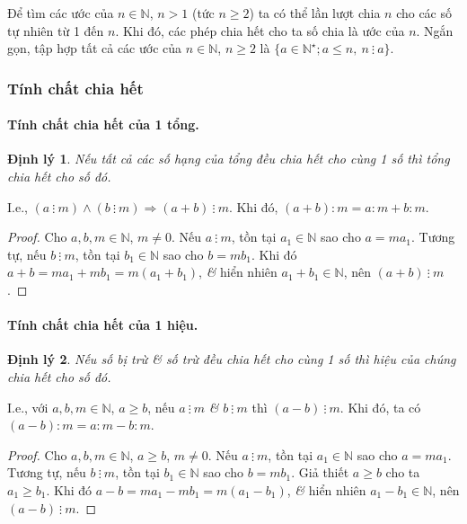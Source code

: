 \documentclass{article}
\numberwithin{equation}{section}
\newtheorem{theorem}{Định lý}[section]
\begin{document}
Để tìm các ước của $n\in\mathbb{N}$, $n > 1$ (tức $n\ge 2$) ta có thể lần lượt chia $n$ cho các số tự nhiên từ 1 đến $n$. Khi đó, các phép chia hết cho ta số chia là ước của $n$. Ngắn gọn, tập hợp tất cả các ước của $n\in\mathbb{N}$, $n\ge 2$ là $\{a\in\mathbb{N}^\star;a\le n,\ n\ \vdots\ a\}$.

\subsubsection{Tính chất chia hết}

\paragraph{Tính chất chia hết của 1 tổng.}
\begin{theorem}
	Nếu tất cả các số hạng của tổng đều chia hết cho cùng 1 số thì tổng chia hết cho số đó.
\end{theorem}
I.e., $(a\ \vdots\ m)\land(b\ \vdots\ m)\Rightarrow(a + b)\ \vdots\ m$. Khi đó, $(a + b):m = a:m + b:m$.

\begin{proof}[Proof]
	Cho $a,b,m\in\mathbb{N}$, $m\ne 0$. Nếu $a\ \vdots\ m$, tồn tại $a_1\in\mathbb{N}$ sao cho $a = ma_1$. Tương tự, nếu $b\ \vdots\ m$, tồn tại $b_1\in\mathbb{N}$ sao cho $b = mb_1$. Khi đó $a + b = ma_1 + mb_1 = m(a_1 + b_1)$, \textit{\&} hiển nhiên $a_1 + b_1\in\mathbb{N}$, nên $(a + b)\ \vdots\ m$.
\end{proof}

\paragraph{Tính chất chia hết của 1 hiệu.}
\begin{theorem}
	Nếu số bị trừ \textit{\&} số trừ đều chia hết cho cùng 1 số thì hiệu của chúng chia hết cho số đó.
\end{theorem}
I.e., với $a,b,m\in\mathbb{N}$, $a\ge b$, nếu $a\ \vdots\ m$ \textit{\&} $b\ \vdots\ m$ thì $(a - b)\ \vdots\ m$. Khi đó, ta có $(a - b):m = a:m - b:m$.

\begin{proof}[Proof]
	Cho $a,b,m\in\mathbb{N}$, $a\ge b$, $m\ne 0$. Nếu $a\ \vdots\ m$, tồn tại $a_1\in\mathbb{N}$ sao cho $a = ma_1$. Tương tự, nếu $b\ \vdots\ m$, tồn tại $b_1\in\mathbb{N}$ sao cho $b = mb_1$. Giả thiết $a\ge b$ cho ta $a_1\ge b_1$. Khi đó $a - b = ma_1 - mb_1 = m(a_1 - b_1)$, \textit{\&} hiển nhiên $a_1 - b_1\in\mathbb{N}$, nên $(a - b)\ \vdots\ m$.
\end{proof}
\end{document}
